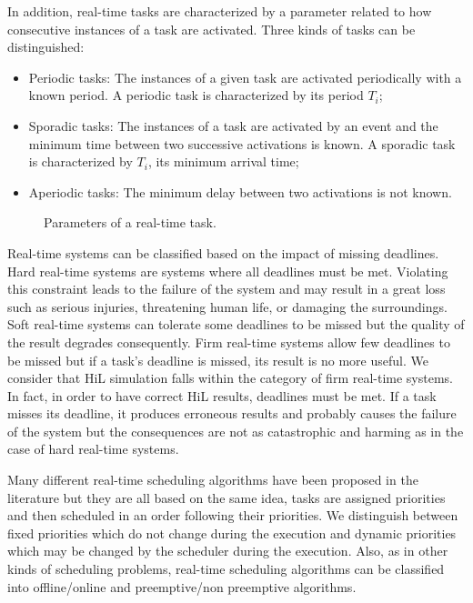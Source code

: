 In addition, real-time tasks are characterized by a parameter related to how consecutive instances of a task are activated. Three kinds of tasks can be distinguished:
\begin{itemize}
\item Periodic tasks: The instances of a given task are activated periodically with a known period. A periodic task is characterized by its period $T_i$;
\item Sporadic tasks: The instances of a task are activated by an event and the minimum time between two successive activations is known. A sporadic task is characterized by $T_i$, its minimum arrival time;
\item Aperiodic tasks: The minimum delay between two activations is not known.
\end{itemize} 

\begin{figure}[phbt]
\centering

\caption{Parameters of a real-time task.}
\label{fig:taskmodel}
\end{figure} 

Real-time systems can be classified based on the impact of missing deadlines. Hard real-time systems are systems where all deadlines must be met. Violating this constraint leads to the failure of the system and may result in a great loss such as serious injuries, threatening human life, or damaging the surroundings. Soft real-time systems can tolerate some deadlines to be missed but the quality of the result degrades consequently. Firm real-time systems allow few deadlines to be missed but if a task's deadline is missed, its result is no more useful. We consider that HiL simulation falls within the category of firm real-time systems. In fact, in order to have correct HiL results, deadlines must be met. If a task misses its deadline, it produces erroneous results and probably causes the failure of the system but the consequences are not as catastrophic and harming as in the case of hard real-time systems.   

Many different real-time scheduling algorithms have been proposed in the literature but they are all based on the same idea, tasks are assigned priorities and then scheduled in an order following their priorities. We distinguish between fixed priorities which do not change during the execution and dynamic priorities which may be changed by the scheduler during the execution. Also, as in other kinds of scheduling problems, real-time scheduling algorithms can be classified into offline/online and preemptive/non preemptive algorithms.

